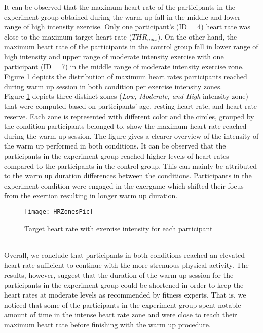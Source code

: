 It can be observed that the maximum heart rate of the participants in the experiment group obtained during the warm up fall in the middle and lower range of high intensity exercise. Only one participant's (ID = 4) heart rate was close to the maximum target heart rate (\begin{math} THR_{max}\end{math}). On the other hand, the maximum heart rate of the participants in the control group fall in lower range of high intensity and upper range of moderate intensity exercise with one participant (ID = 7) in the middle range of moderate intensity exercise zone. Figure \ref{fig:hrzones} depicts the distribution of maximum heart rates participants reached during warm up session in both condition per exercise intensity zones. \\Figure \ref{fig:hrzones} depicts three distinct zones (\textit{Low, Moderate, and High} intensity zone) that were computed based on participants' age, resting heart rate, and heart rate reserve. Each zone is represented with different color and the circles, grouped by the condition participants belonged to, show the maximum heart rate reached during the warm up session. The figure gives a clearer overview of the intensity of the warm up performed in both conditions. It can be observed that the participants in the experiment group reached higher levels of heart rates compared to the participants in the control group. This can mainly be attributed to the warm up duration differences between the conditions. Participants in the experiment condition were engaged in the exergame which shifted their focus from the exertion resulting in longer warm up duration.\\%
\begin{figure}[h]
    \centering
    \texttt{[image: HRZonesPic]}
    \caption{Target heart rate with exercise intensity for each participant}
    \label{fig:hrzones}
\end{figure}\\
Overall, we conclude that  participants in both conditions reached an elevated heart rate sufficient to continue with the more strenuous physical activity. The results, however, suggest that the duration  of the warm up session for the participants in the experiment group could be shortened in order to keep the heart rates at moderate levels as recommended by fitness experts. That is, we noticed that some of the participants in the experiment group spent notable amount of time in the intense heart rate zone and were close to reach their maximum heart rate before finishing with the warm up procedure. \\ \\
